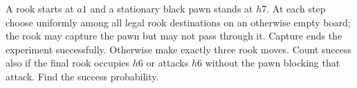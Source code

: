 A rook starts at $a1$ and a stationary black pawn stands at $h7$. At each step choose uniformly among all legal rook destinations on an otherwise empty board; the rook may capture the pawn but may not pass through it. Capture ends the experiment successfully. Otherwise make exactly three rook moves. Count success also if the final rook occupies $h6$ or attacks $h6$ without the pawn blocking that attack. Find the success probability.
